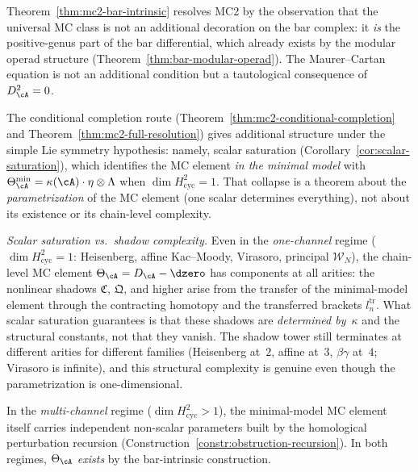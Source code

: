 \begin{remark}
\label{rem:mc2-bar-intrinsic-perspective}
Theorem~\ref{thm:mc2-bar-intrinsic} resolves MC2 by the
observation that the universal MC class is not an additional
decoration on the bar complex: it \emph{is} the positive-genus
part of the bar differential, which already exists by the modular
operad structure (Theorem~\ref{thm:bar-modular-operad}).  The
Maurer--Cartan equation is not an additional condition but a
tautological consequence of~$D_\cA^2 = 0$.

The conditional completion route
(Theorem~\ref{thm:mc2-conditional-completion} and
Theorem~\ref{thm:mc2-full-resolution}) gives additional
structure under the simple Lie symmetry hypothesis: namely,
scalar saturation (Corollary~\ref{cor:scalar-saturation}),
which identifies the MC element \emph{in the minimal model}
with $\Theta^{\min}_\cA = \kappa(\cA) \cdot \eta \otimes \Lambda$
when $\dim H^2_{\mathrm{cyc}} = 1$.  That collapse is a
theorem about the \emph{parametrization} of the MC element
(one scalar determines everything), not about its existence or
its chain-level complexity.

\emph{Scalar saturation vs.\ shadow complexity.}
Even in the \emph{one-channel} regime
($\dim H^2_{\mathrm{cyc}} = 1$: Heisenberg, affine
Kac--Moody, Virasoro, principal $\mathcal{W}_N$), the
chain-level MC element $\Theta_\cA = D_\cA - \dzero$ has
components at all arities: the nonlinear shadows
$\mathfrak{C}$, $\mathfrak{Q}$, and higher arise from
the transfer of the minimal-model element through the
contracting homotopy and the transferred brackets
$l_n^{\mathrm{tr}}$.  What scalar saturation guarantees
is that these shadows are \emph{determined by~$\kappa$}
and the structural constants, not that they vanish.
The shadow tower still terminates at different arities
for different families (Heisenberg at~$2$, affine at~$3$,
$\beta\gamma$ at~$4$; Virasoro is infinite), and this
structural complexity is genuine even though the
parametrization is one-dimensional.

In the \emph{multi-channel} regime
($\dim H^2_{\mathrm{cyc}} > 1$), the minimal-model MC element
itself carries independent non-scalar parameters built by
the homological perturbation recursion
(Construction~\ref{constr:obstruction-recursion}).
In both regimes, $\Theta_\cA$ \emph{exists} by the
bar-intrinsic construction.
\end{remark}

